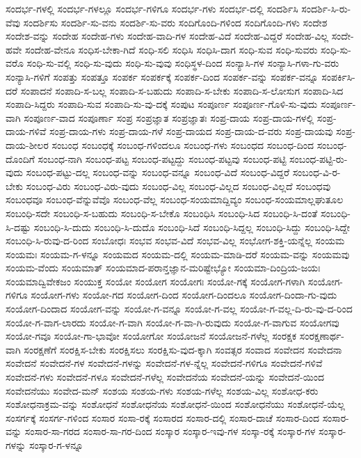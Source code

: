 {ಸಂದರ್ಭ-ಗಳಲ್ಲಿ
ಸಂದರ್ಭ-ಗಳಲ್ಲೂ
ಸಂದರ್ಭ-ಗಳಿಗೂ
ಸಂದರ್ಭ-ಗಳು
ಸಂದರ್ಭ-ದಲ್ಲಿ
ಸಂದರ್ಶಿಸಿ
ಸಂದರ್ಶಿ-ಸಿ-ರು-ವೆವು
ಸಂದರ್ಶಿಸು
ಸಂದರ್ಶಿ-ಸು-ವನು
ಸಂದರ್ಶಿ-ಸು-ವರು
ಸಂದಿಗೊಂದಿ-ಗಳಿಂದ
ಸಂದಿಗೊಂದಿ-ಗಳು
ಸಂದೇಶ
ಸಂದೇಶ-ವನ್ನು
ಸಂದೇಹ
ಸಂದೇಹ-ಗಳು
ಸಂದೇಹ-ವಾದಿ-ಗಳ
ಸಂದೇಹ-ವಿದೆ
ಸಂದೇಹ-ವಿದ್ದರೆ
ಸಂದೇಹ-ವಿಲ್ಲ
ಸಂದೇ-ಹವೇ
ಸಂದೇಹ-ವೇನೂ
ಸಂಧಿಸ-ಬೇಕಾ-ಗಿದೆ
ಸಂಧಿ-ಸಲಿ
ಸಂಧಿಸಿ
ಸಂಧಿಸಿ-ದಾಗ
ಸಂಧಿ-ಸುವ
ಸಂಧಿ-ಸುವರು
ಸಂಧಿ-ಸು-ವರೊ
ಸಂಧಿ-ಸು-ವಲ್ಲಿ
ಸಂಧಿ-ಸು-ವುದು
ಸಂಧಿ-ಸು-ವುವು
ಸಂಧಿಸ್ಥಳ-ದಿಂದ
ಸಂನ್ಯಾಸಿ-ಗಳ
ಸಂನ್ಯಾಸಿ-ಗಳಾ-ಗು-ವರು
ಸಂನ್ಯಾಸಿ-ಗಳಿಗೆ
ಸಂಪತ್ತು
ಸಂಪತ್ತೂ
ಸಂಪರ್ಕ
ಸಂಪರ್ಕಕ್ಕೆ
ಸಂಪರ್ಕ-ದಿಂದ
ಸಂಪರ್ಕ-ವನ್ನು
ಸಂಪರ್ಕ-ವನ್ನೂ
ಸಂಪರ್ಕಿಸಿ-ದರೆ
ಸಂಪಾದನೆ
ಸಂಪಾದಿ-ಸ-ಬಲ್ಲ
ಸಂಪಾದಿ-ಸ-ಬಹುದು
ಸಂಪಾದಿ-ಸ-ಬೇಕು
ಸಂಪಾದಿ-ಸ-ಲೋಸುಗ
ಸಂಪಾದಿ-ಸಿದ
ಸಂಪಾದಿ-ಸಿದ್ದರು
ಸಂಪಾದಿ-ಸುವ
ಸಂಪಾದಿ-ಸು-ವು-ದಕ್ಕೆ
ಸಂಪುಟ
ಸಂಪೂರ್ಣ
ಸಂಪೂರ್ಣ-ಗೊಳಿ-ಸು-ವುದು
ಸಂಪೂರ್ಣ-ವಾಗಿ
ಸಂಪೂರ್ಣ-ವಾದ
ಸಂಪೂರ್ಣಾ
ಸಂಪ್ರ
ಸಂಪ್ರಜ್ಞಾತ
ಸಂಪ್ರಜ್ಞಾತಃ
ಸಂಪ್ರ-ದಾಯ
ಸಂಪ್ರ-ದಾಯ-ಗಳಲ್ಲಿ
ಸಂಪ್ರ-ದಾಯ-ಗಳಿವೆ
ಸಂಪ್ರ-ದಾಯ-ಗಳು
ಸಂಪ್ರ-ದಾಯ-ಗಳೆ
ಸಂಪ್ರ-ದಾಯದ
ಸಂಪ್ರ-ದಾಯ-ದ-ವರು
ಸಂಪ್ರ-ದಾಯವು
ಸಂಪ್ರ-ದಾಯ-ಶೀಲರ
ಸಂಬಂಧ
ಸಂಬಂಧಕ್ಕೆ
ಸಂಬಂಧ-ಗಳಿಂದಲೂ
ಸಂಬಂಧ-ಗಳು
ಸಂಬಂಧದ
ಸಂಬಂಧ-ದಿಂದ
ಸಂಬಂಧ-ದೊಂದಿಗೆ
ಸಂಬಂಧ-ನಾಗಿ
ಸಂಬಂಧ-ಪಟ್ಟ
ಸಂಬಂಧ-ಪಟ್ಟದ್ದು
ಸಂಬಂಧ-ಪಟ್ಟವು
ಸಂಬಂಧ-ಪಟ್ಟಿ
ಸಂಬಂಧ-ಪಟ್ಟಿ-ರು-ವುದು
ಸಂಬಂಧ-ಪಟ್ಟು-ದಲ್ಲ
ಸಂಬಂಧ-ವನ್ನು
ಸಂಬಂಧ-ವನ್ನೂ
ಸಂಬಂಧ-ವಿದೆ
ಸಂಬಂಧ-ವಿದ್ದರೆ
ಸಂಬಂಧ-ವಿ-ರ-ಬೇಕು
ಸಂಬಂಧ-ವಿರು
ಸಂಬಂಧ-ವಿರು-ವುದು
ಸಂಬಂಧ-ವಿಲ್ಲ
ಸಂಬಂಧ-ವಿಲ್ಲದ
ಸಂಬಂಧ-ವಿಲ್ಲದೆ
ಸಂಬಂಧವು
ಸಂಬಂಧವೂ
ಸಂಬಂಧ-ವೆನ್ನುವೆವೊ
ಸಂಬಂಧ-ವೆಲ್ಲ
ಸಂಬಂಧ-ಸಂಯಮಾದ್ದಿವ್ಯಂ
ಸಂಬಂಧ-ಸಂಯಮಾಲ್ಲಘುತೂಲ
ಸಂಬಂಧಿ-ಸದೇ
ಸಂಬಂಧಿ-ಸ-ಬಹುದು
ಸಂಬಂಧಿ-ಸ-ಬೇಕೊ
ಸಂಬಂಧಿಸಿ
ಸಂಬಂಧಿ-ಸಿದ
ಸಂಬಂಧಿ-ಸಿ-ದಂತೆ
ಸಂಬಂಧಿ-ಸಿ-ದಷ್ಟು
ಸಂಬಂಧಿ-ಸಿ-ದುದು
ಸಂಬಂಧಿ-ಸಿ-ದುದೊ
ಸಂಬಂಧಿ-ಸಿದೆ
ಸಂಬಂಧಿ-ಸಿದ್ದಲ್ಲ
ಸಂಬಂಧಿ-ಸಿದ್ದು
ಸಂಬಂಧಿ-ಸಿದ್ದೇ
ಸಂಬಂಧಿ-ಸಿ-ರುವು-ದ-ರಿಂದ
ಸಂಬೋಧಃ
ಸಂಭವ
ಸಂಭವ-ವಿದೆ
ಸಂಭವ-ವಿಲ್ಲ
ಸಂಭೋಗ-ಶಕ್ತಿ-ಯನ್ನೆಲ್ಲ
ಸಂಯಮ
ಸಂಯಮಃ
ಸಂಯಮ-ಗ-ಳನ್ನೂ
ಸಂಯಮದ
ಸಂಯಮ-ದಲ್ಲಿ
ಸಂಯಮ-ಮಾಡಿ-ದರೆ
ಸಂಯಮ-ವನ್ನು
ಸಂಯಮವು
ಸಂಯಮ-ವೆಂದು
ಸಂಯಮಾತ್
ಸಂಯಮಾದ-ಪರಾನ್ತಜ್ಞಾನ-ಮರಿಷ್ಟೇಭ್ಯೋ
ಸಂಯಮಾ-ದಿಂದ್ರಿಯ-ಜಯಃ
ಸಂಯಮಾದ್ವಿವೇಕಜಂ
ಸಂಯುಕ್ತ
ಸಂಯೋ
ಸಂಯೋಗ
ಸಂಯೋಗಃ
ಸಂಯೋ-ಗಕ್ಕೆ
ಸಂಯೋಗ-ಗಳಾಗಿ
ಸಂಯೋಗ-ಗಳಿಗೂ
ಸಂಯೋಗ-ಗಳು
ಸಂಯೋ-ಗದ
ಸಂಯೋಗ-ದಿಂದ
ಸಂಯೋಗ-ದಿಂದಲೂ
ಸಂಯೋಗ-ದಿಂದಾ-ಗು-ವುದು
ಸಂಯೋಗ-ದಿಂದಾದ
ಸಂಯೋಗ-ವನ್ನು
ಸಂಯೋ-ಗ-ವನ್ನೂ
ಸಂಯೋ-ಗ-ವಲ್ಲ
ಸಂಯೋ-ಗ-ವಲ್ಲ-ದಿ-ರು-ವು-ದ-ರಿಂದ
ಸಂಯೋ-ಗ-ವಾಗ-ಲಾರದು
ಸಂಯೋ-ಗ-ವಾಗಿ
ಸಂಯೋ-ಗ-ವಾ-ಗಿ-ರುವುದು
ಸಂಯೋ-ಗ-ವಾಗುವ
ಸಂಯೋಗವು
ಸಂಯೋ-ಗವೂ
ಸಂಯೋ-ಗಾ-ಭಾವೋ
ಸಂಯೋಗೋ
ಸಂಯೋಜನೆ
ಸಂಯೋಜನೆ-ಗಳೆಲ್ಲ
ಸಂರಕ್ಷಕ
ಸಂರಕ್ಷಣಾರ್ಥ-ವಾಗಿ
ಸಂರಕ್ಷಣೆಗೆ
ಸಂರಕ್ಷಿಸ-ಬೇಕು
ಸಂರಕ್ಷಿಸಲು
ಸಂರಕ್ಷಿಸು-ವುದ-ಕ್ಕಾಗಿ
ಸಂವತ್ಸರ
ಸಂವಾದ
ಸಂವೇದನ
ಸಂವೇದನಾ
ಸಂವೇದನೆ
ಸಂವೇದನೆ-ಗಳ
ಸಂವೇದನೆ-ಗಳನ್ನು
ಸಂವೇದನೆ-ಗಳ-ನ್ನೆಲ್ಲ
ಸಂವೇದನೆ-ಗಳಿಗೂ
ಸಂವೇದನೆ-ಗಳಿವೆ
ಸಂವೇದನೆ-ಗಳು
ಸಂವೇದನೆ-ಗಳೂ
ಸಂವೇದನೆ-ಗಳೆಲ್ಲ
ಸಂವೇದನೆಯ
ಸಂವೇದನೆ-ಯನ್ನು
ಸಂವೇದನೆ-ಯಿಂದ
ಸಂವೇದನೆಯು
ಸಂವೇದ-ಮನ್
ಸಂಶಯ
ಸಂಶಯ-ಗಳು
ಸಂಶಯ-ಗಳೆಲ್ಲ
ಸಂಶಯ-ವಿಲ್ಲ
ಸಂಶೋಧ-ಕರು
ಸಂಶೋಧನಾಕ್ರಮ-ವನ್ನು
ಸಂಶೋಧನೆ
ಸಂಶೋಧನೆಯ
ಸಂಶೋಧನೆ-ಯಿಂದ
ಸಂಶೋಧನೆಯು
ಸಂಶೋಧನೆ-ಯೆಲ್ಲ
ಸಂಸರ್ಗಕ್ಕೆ
ಸಂಸರ್ಗ-ಗಳಿಂದ
ಸಂಸಾರ
ಸಂಸಾ-ರಕ್ಕೆ
ಸಂಸಾರದ
ಸಂಸಾರ-ದಲ್ಲಿ
ಸಂಸಾರ-ದಾಚೆ
ಸಂಸಾರ-ದಿಂದ
ಸಂಸಾರ-ವನ್ನು
ಸಂಸಾರ-ಸಾ-ಗರದ
ಸಂಸಾರ-ಸಾ-ಗರ-ದಿಂದ
ಸಂಸ್ಕಾರ
ಸಂಸ್ಕಾರ-ಇವು-ಗಳ
ಸಂಸ್ಕಾ-ರಕ್ಕೆ
ಸಂಸ್ಕಾರ-ಗಳ
ಸಂಸ್ಕಾರ-ಗಳನ್ನು
ಸಂಸ್ಕಾರ-ಗ-ಳನ್ನೂ
}
